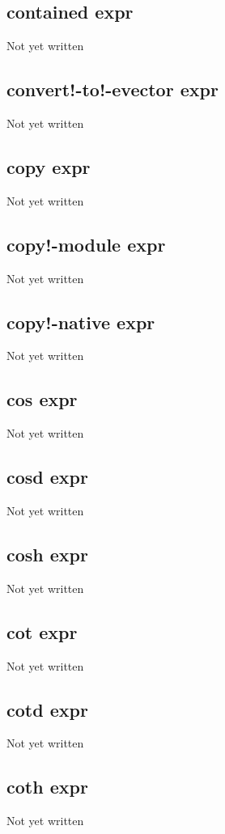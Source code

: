 \documentclass[a4paper,11pt]{article}
\begin{document}
{\subsection{\ttfamily contained expr}
   Not yet written

\subsection{\ttfamily convert!-to!-evector expr}
   Not yet written

\subsection{\ttfamily copy expr}
   Not yet written

\subsection{\ttfamily copy!-module expr}
   Not yet written

\subsection{\ttfamily copy!-native expr}
   Not yet written

\subsection{\ttfamily cos expr}
   Not yet written

\subsection{\ttfamily cosd expr}
   Not yet written

\subsection{\ttfamily cosh expr}
   Not yet written

\subsection{\ttfamily cot expr}
   Not yet written

\subsection{\ttfamily cotd expr}
   Not yet written

\subsection{\ttfamily coth expr}
   Not yet written

}
\end{document}
